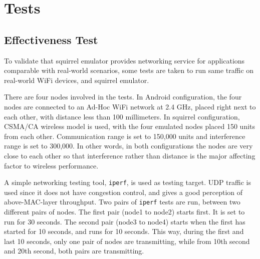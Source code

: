 \documentclass[12pt]{report}
\begin{document}
\section{Tests}

\subsection{Effectiveness Test}

To validate that squirrel emulator provides networking service for applications comparable with real-world scenarios, some tests are taken to run same traffic on real-world WiFi devices, and squirrel emulator.

There are four nodes involved in the tests. In Android configuration, the four nodes are connected to an Ad-Hoc WiFi network at 2.4 GHz, placed right next to each other, with distance less than 100 millimeters. In squirrel configuration, CSMA/CA wireless model is used, with the four emulated nodes placed 150 units from each other. Communication range is set to 150,000 units and interference range is set to 300,000. In other words, in both configurations the nodes are very close to each other so that interference rather than distance is the major affecting factor to wireless performance.

A simple networking testing tool, \texttt{iperf}, is used as testing target. UDP traffic is used since it does not have congestion control, and gives a good perception of above-MAC-layer throughput. Two pairs of \texttt{iperf} tests are run, between two different pairs of nodes. The first pair (node1 to node2) starts first. It is set to run for 30 seconds. The second pair (node3 to node4) starts when the first has started for 10 seconds, and runs for 10 seconds. This way, during the first and last 10 seconds, only one pair of nodes are transmitting, while from 10th second and 20th second, both pairs are transmitting.
\end{document}
